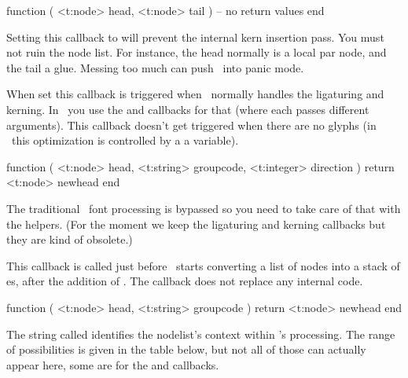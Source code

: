 \starttyping[option=LUA]
function (
    <t:node> head,
    <t:node> tail
)
    -- no return values
end
\stoptyping

Setting this callback to  will prevent the internal kern insertion
pass. You must not ruin the node list. For instance, the head normally is a local
par node, and the tail a glue. Messing too much can push \LUATEX\ into panic
mode.

\stopsubsection

\startsubsection[title=glyph_run]

When set this callback is triggered when \TEX\ normally handles the ligaturing
and kerning. In \LUATEX\ you use the  and 
callbacks for that (where each passes different arguments). This callback doesn't
get triggered when there are no glyphs (in \LUATEX\ this optimization is
controlled by a a variable).

\starttyping[option=LUA]
function (
    <t:node>    head,
    <t:string>  groupcode,
    <t:integer> direction
)
    return <t:node> newhead
end
\stoptyping

The traditional \TEX\ font processing is bypassed so you need to take care of that
with the helpers. (For the moment we keep the ligaturing and kerning callbacks but
they are kind of obsolete.)

\stopsubsection

\startsubsection[title=pre_linebreak]

This callback is called just before \LUATEX\ starts converting a list of nodes
into a stack of \type {\hbox}es, after the addition of \type {\parfillskip}. The
callback does not replace any internal code.

\starttyping[option=LUA]
function (
    <t:node>   head,
    <t:string> groupcode
)
    return <t:node> newhead
end
\stoptyping

The string called  identifies the nodelist's context within
\TEX's processing. The range of possibilities is given in the table below, but
not all of those can actually appear here, some are for the  and
 callbacks.

